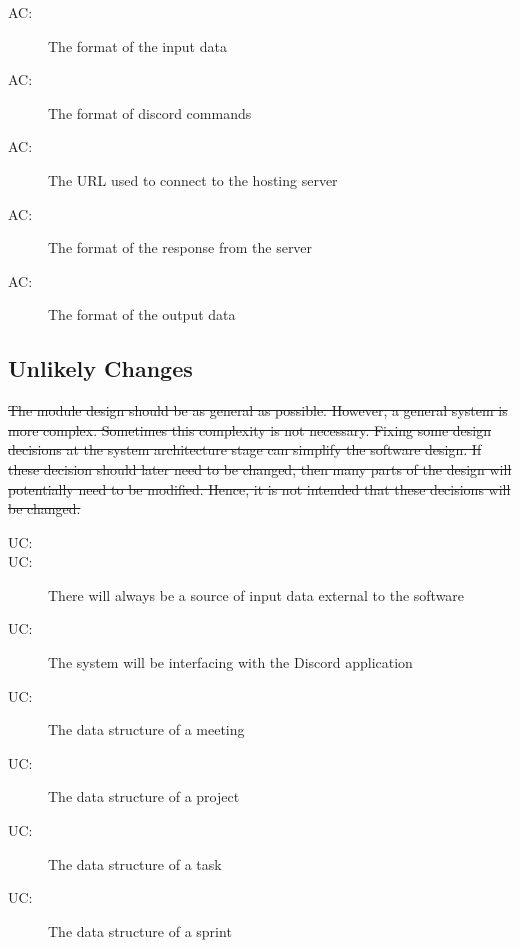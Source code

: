 \documentclass[12pt, titlepage]{article}
\newcounter{acnum}
\newcommand{\actheacnum}{AC\theacnum}
\newcounter{ucnum}
\newcommand{\uctheucnum}{UC\theucnum}
\begin{document}
\begin{description}
\item[ \actheacnum \label{acInput1}:] The format of the input data
\item[ \actheacnum \label{acInput2}:] The format of discord commands
\item[ \actheacnum \label{acServer1}:] The URL used to connect to the hosting server
\item[ \actheacnum \label{acServer2}:] The format of the response from the server
\item[ \actheacnum \label{acOutput}:] The format of the output data
\end{description}

\subsection{Unlikely Changes} \label{SecUchange}

\sout{The module design should be as general as possible. However, a general system is more complex. Sometimes this complexity is not necessary. Fixing some design decisions at the system architecture stage can simplify the software design. If these decision should later need to be changed, then many parts of the design will potentially need to be modified. Hence, it is not intended that these decisions will be changed.}

\begin{description}
\item[ \uctheucnum \label{ucIO}:] 
\item[ \uctheucnum \label{ucInput}:] There will always be a source of input data external to the software
\item[ \uctheucnum \label{ucInput}:] The system will be interfacing with the Discord application
\item[ \uctheucnum \label{ucInput}:] The data structure of a meeting
\item[ \uctheucnum \label{ucInput}:] The data structure of a project
\item[ \uctheucnum \label{ucInput}:] The data structure of a task
\item[ \uctheucnum \label{ucInput}:] The data structure of a sprint
\end{description}
\end{document}
